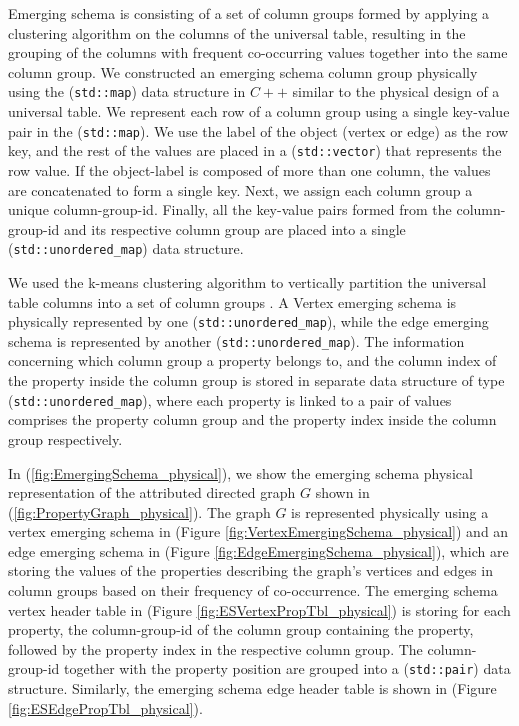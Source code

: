 {Emerging schema is consisting of a set of column groups formed by applying a clustering algorithm on the columns of the universal table, resulting in the grouping of the columns with frequent co-occurring values together into the same column group. We constructed an emerging schema column group physically using the (\texttt{std::map}) data structure in $C++$ similar to the physical design of a universal table. We represent each row of a column group using a single key-value pair in the (\texttt{std::map}). We use the label of the object (vertex or edge) as the row key, and the rest of the values are placed in a (\texttt{std::vector}) that represents the row value. If the object-label is composed of more than one column, the values are concatenated to form a single key. Next, we assign each column group a unique column-group-id. Finally, all the key-value pairs formed from the column-group-id and its respective column group are placed into a single (\texttt{std::unordered\_map}) data structure.

We used the k-means clustering algorithm to vertically partition the universal table columns into a set of column groups \cite{macqueen1967}. A Vertex emerging schema is physically represented by one (\texttt{std::unordered\_map}), while the edge emerging schema is represented by another (\texttt{std::unordered\_map}). The information concerning which column group a property belongs to, and the column index of the property inside the column group is stored in separate data structure of type (\texttt{std::unordered\_map}), where each property is linked to a pair of values comprises the property column group and the property index inside the column group respectively.

In (\ref{fig:EmergingSchema_physical}), we show the emerging schema physical representation of the attributed directed graph $G$ shown in (\ref{fig:PropertyGraph_physical}). The graph $G$ is represented physically using a vertex emerging schema in (Figure \ref{fig:VertexEmergingSchema_physical}) and an edge emerging schema in (Figure \ref{fig:EdgeEmergingSchema_physical}), which are storing the values of the properties describing the graph's vertices and edges in column groups based on their frequency of co-occurrence. The emerging schema vertex header table in (Figure \ref{fig:ESVertexPropTbl_physical}) is storing for each property, the column-group-id of the column group containing the property, followed by the property index in the respective column group. The column-group-id together with the property position are grouped into a (\texttt{std::pair}) data structure. Similarly, the emerging schema edge header table is shown in (Figure \ref{fig:ESEdgePropTbl_physical}).



}
